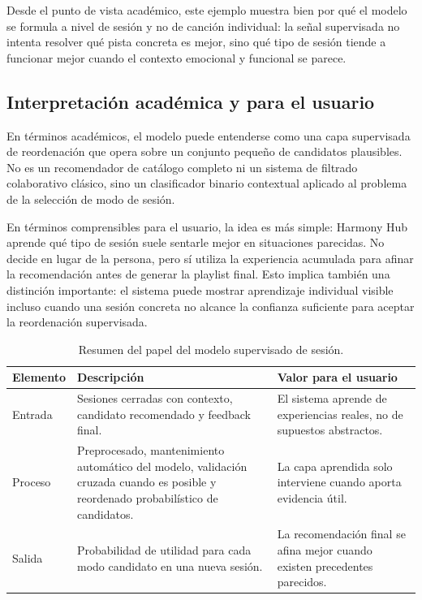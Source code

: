 Desde el punto de vista académico, este ejemplo muestra bien por qué el modelo
se formula a nivel de sesión y no de canción individual: la señal supervisada
no intenta resolver qué pista concreta es mejor, sino qué tipo de sesión
tiende a funcionar mejor cuando el contexto emocional y funcional se parece.

\subsection{Interpretación académica y para el usuario}

En términos académicos, el modelo puede entenderse como una capa supervisada de
reordenación que opera sobre un conjunto pequeño de candidatos plausibles. No
es un recomendador de catálogo completo ni un sistema de filtrado colaborativo
clásico, sino un clasificador binario contextual aplicado al problema de la
selección de modo de sesión.

En términos comprensibles para el usuario, la idea es más simple: Harmony Hub
aprende qué tipo de sesión suele sentarle mejor en situaciones parecidas. No
decide en lugar de la persona, pero sí utiliza la experiencia acumulada para
afinar la recomendación antes de generar la playlist final. Esto implica también
una distinción importante: el sistema puede mostrar aprendizaje individual
visible incluso cuando una sesión concreta no alcance la confianza suficiente
para aceptar la reordenación supervisada.

\begin{table}[H]
\centering
\scriptsize
\renewcommand{\arraystretch}{1.0}
\setlength{\tabcolsep}{3pt}
\begin{tabularx}{\textwidth}{|P{2.7cm}|Y|Y|}
\hline
\textbf{Elemento} & \textbf{Descripción} & \textbf{Valor para el usuario} \\
\hline
Entrada & Sesiones cerradas con contexto, candidato recomendado y feedback final. & El sistema aprende de experiencias reales, no de supuestos abstractos. \\
\hline
Proceso & Preprocesado, mantenimiento automático del modelo, validación cruzada cuando es posible y reordenado probabilístico de candidatos. & La capa aprendida solo interviene cuando aporta evidencia útil. \\
\hline
Salida & Probabilidad de utilidad para cada modo candidato en una nueva sesión. & La recomendación final se afina mejor cuando existen precedentes parecidos. \\
\hline
\end{tabularx}
\caption{Resumen del papel del modelo supervisado de sesión.}
\label{tab:resumen_modelo_supervisado}
\end{table}

